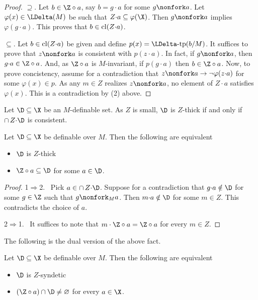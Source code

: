 \begin{proof}
  $\supseteq$. 
  Let $b\in\Z\circ a$, say $b=g{\cdot}a$ for some $g\nonfork a$.
  Let $\varphi(x)\in\LDelta(M)$ be such that $Z{\cdot}a\subseteq\varphi(\X)$.
  Then $g\nonfork a$ implies $\varphi(g{\cdot}a)$.
  This proves that $b\in{\rm cl}(Z{\cdot}a)$.
  
  $\subseteq$. 
  Let $b\in{\rm cl}(Z{\cdot}a)$ be given and define $p(x)=\LDelta\mbox{-tp}(b/M)$.
  It suffices to prove that $z\nonfork a$ is consistent with $p(z{\cdot}a)$.
  In fact, if $g\nonfork a$, then $g{\cdot}a\in\Z\circ a$.
  And, as $\Z\circ a$ is $M$-invariant, if $p(g{\cdot}a)$ then $b\in\Z\circ a$.
  Now, to prove concistency, assume for a contradiction that $z\nonfork a\rightarrow\neg\varphi(z{\cdot}a)$ for some $\varphi(x)\in p$.
  As any $m\in Z$ realizes $z\nonfork a$, no element of $Z{\cdot}a$ satisfies $\varphi(x)$.
  This is a contradiction by (2) above.
\end{proof}


Let $\D\subseteq\X$ be an $M$-definable set.
As $Z$ is small, $\D$ is $Z$-thick if and only if $\cap\,Z{\cdot}\D$ is consistent.

\begin{fact}\label{fact_thick_circ}
  Let $\D\subseteq\X$ be definable over $M$.
  Then the following are equivalent
  \begin{itemize}
    \item [1.] $\D$ is $Z$-thick
    \item [2.] $\Z\circ a\subseteq\D$ for some $a\in\D$.
  \end{itemize}
\end{fact}

\begin{proof}
  1$\Rightarrow$2. \ 
  Pick $a\in\cap\,Z{\cdot}\D$.
  Suppose for a contradiction that $g{\cdot}a\notin\D$ for some $g\in\Z$ such that $g\nonfork_M a$.
  Then $m{\cdot}a\notin\D$ for some $m\in Z$.
  This contradicts the choice of $a$.  

  2$\Rightarrow$1. \ 
  It suffices to note that $m\cdot\Z\circ a=\Z\circ a$ for every $m\in Z$.
\end{proof}

The following is the dual version of the above fact.

\begin{fact}
  Let $\D\subseteq\X$ be definable over $M$.
  Then the following are equivalent
  \begin{itemize}
    \item [1.] $\D$ is $Z$-syndetic
    \item [2.] $(\Z\circ a)\cap\D\neq\varnothing$ for every $a\in\X$.
  \end{itemize}
\end{fact}

